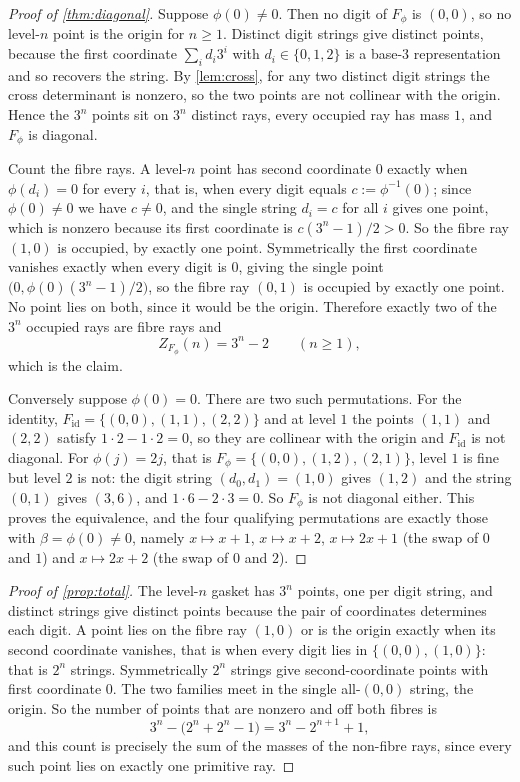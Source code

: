 \documentclass[11pt]{amsart}
\theoremstyle{definition}
\theoremstyle{remark}
\begin{document}
\begin{proof}[Proof of \cref{thm:diagonal}]
Suppose $\phi(0)\neq 0$. Then no digit of $F_\phi$ is $(0,0)$, so no level-$n$ point is the origin for $n\ge 1$. Distinct digit strings give distinct points, because the first coordinate $\sum_i d_i 3^i$ with $d_i\in\{0,1,2\}$ is a base-$3$ representation and so recovers the string. By \cref{lem:cross}, for any two distinct digit strings the cross determinant is nonzero, so the two points are not collinear with the origin. Hence the $3^n$ points sit on $3^n$ distinct rays, every occupied ray has mass $1$, and $F_\phi$ is diagonal.

Count the fibre rays. A level-$n$ point has second coordinate $0$ exactly when $\phi(d_i)=0$ for every $i$, that is, when every digit equals $c:=\phi^{-1}(0)$; since $\phi(0)\neq 0$ we have $c\neq 0$, and the single string $d_i=c$ for all $i$ gives one point, which is nonzero because its first coordinate is $c(3^n-1)/2>0$. So the fibre ray $(1,0)$ is occupied, by exactly one point. Symmetrically the first coordinate vanishes exactly when every digit is $0$, giving the single point $\bigl(0,\phi(0)(3^n-1)/2\bigr)$, so the fibre ray $(0,1)$ is occupied by exactly one point. No point lies on both, since it would be the origin. Therefore exactly two of the $3^n$ occupied rays are fibre rays and
\[
Z_{F_\phi}(n)=3^n-2 \qquad (n\ge 1),
\]
which is the claim.

Conversely suppose $\phi(0)=0$. There are two such permutations. For the identity, $F_{\mathrm{id}}=\{(0,0),(1,1),(2,2)\}$ and at level $1$ the points $(1,1)$ and $(2,2)$ satisfy $1\cdot 2-1\cdot 2=0$, so they are collinear with the origin and $F_{\mathrm{id}}$ is not diagonal. For $\phi(j)=2j$, that is $F_\phi=\{(0,0),(1,2),(2,1)\}$, level $1$ is fine but level $2$ is not: the digit string $(d_0,d_1)=(1,0)$ gives $(1,2)$ and the string $(0,1)$ gives $(3,6)$, and $1\cdot 6-2\cdot 3=0$. So $F_\phi$ is not diagonal either. This proves the equivalence, and the four qualifying permutations are exactly those with $\beta=\phi(0)\neq 0$, namely $x\mapsto x+1$, $x\mapsto x+2$, $x\mapsto 2x+1$ (the swap of $0$ and $1$) and $x\mapsto 2x+2$ (the swap of $0$ and $2$).
\end{proof}

\begin{proof}[Proof of \cref{prop:total}]
The level-$n$ gasket has $3^n$ points, one per digit string, and distinct strings give distinct points because the pair of coordinates determines each digit. A point lies on the fibre ray $(1,0)$ or is the origin exactly when its second coordinate vanishes, that is when every digit lies in $\{(0,0),(1,0)\}$: that is $2^n$ strings. Symmetrically $2^n$ strings give second-coordinate points with first coordinate $0$. The two families meet in the single all-$(0,0)$ string, the origin. So the number of points that are nonzero and off both fibres is
\[
3^n-\bigl(2^n+2^n-1\bigr)=3^n-2^{n+1}+1 ,
\]
and this count is precisely the sum of the masses of the non-fibre rays, since every such point lies on exactly one primitive ray.
\end{proof}
\end{document}
